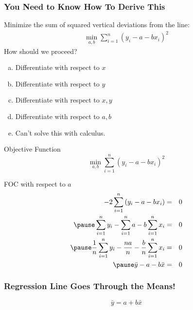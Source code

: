 \documentclass[handout]{beamer}
\begin{document}
\begin{frame}
\frametitle{You Need to Know How To Derive This}
\alert{Minimize the sum of squared vertical deviations from the line:}
\begin{eqnarray*}
\min_{a,b}  \sum_{i=1}^n (y_i - a - b x_i)^2
\end{eqnarray*}
How should we proceed?
\begin{enumerate}[(a)]
	\item Differentiate with respect to $x$
	\item Differentiate with respect to $y$
	\item Differentiate with respect to $x,y$
	\item Differentiate with respect to $a,b$
	\item Can't solve this with calculus.
\end{enumerate}
\end{frame}
\begin{frame}
\begin{block}{Objective Function}
$$\displaystyle \min_{a,b}  \sum_{i=1}^n (y_i - a - b x_i)^2$$
\end{block}
\begin{block}{FOC with respect to $a$}\pause
\begin{eqnarray*}
	-2 \sum_{i=1}^n\left(y_i - a -bx_i\right) &=& 0 \\\pause
	\sum_{i=1}^n y_i - \sum_{i=1}^n a - b\sum_{i=1}^n x_i &=& 0 \\\pause
	\frac{1}{n} \sum_{i=1}^n y_i - \frac{na}{n} -  \frac{b}{n} \sum_{i=1}^n x_i &=& 0\\\pause
	\bar{y} - a - b\bar{x} &=& 0
\end{eqnarray*}
\end{block}
\end{frame}
\begin{frame}

\frametitle{Regression Line Goes Through the Means!}
 \Huge
\begin{equation*}\boxed{\bar{y} = a + b\bar{x}}\end{equation*}
\normalsize
\end{frame}
\end{document}
